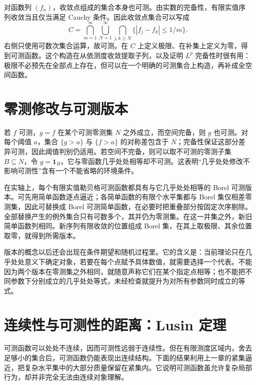 对函数列 $(f_n)$，收敛点组成的集合本身也可测。由实数的完备性，有限实值序列收敛当且仅当满足 Cauchy 条件。因此收敛点集合可以写成
\[
 C=\bigcap_{m=1}^{\infty}\bigcup_{N=1}^{\infty}
 \bigcap_{j,k\geq N}\{|f_j-f_k|\leq1/m\}.
\]
右侧只使用可数次集合运算，故可测。在 $C$ 上定义极限、在补集上定义为零，得到可测函数。这个构造在从依测度收敛提取子列，以及证明 $L^p$ 完备性时很有用：极限不必预先在全部点上存在，但可以在一个明确的可测集合上构造，再补成全空间函数。

\section{零测修改与可测版本}
若 $f$ 可测，$g=f$ 在某个可测零测集 $N$ 之外成立，而空间完备，则 $g$ 也可测。对每个阈值 $a$，集合 $\{g>a\}$ 与 $\{f>a\}$ 的对称差包含于 $N$；完备性保证这部分差异可测，因此阈值判别仍适用。若空间不完备，则可以取不可测的零测子集 $B\subseteq N$，令 $g=\mathbf1_B$，它与零函数几乎处处相等却不可测。这表明“几乎处处修改不影响可测性”含有一个不能省略的环境条件。

在实轴上，每个有限实值勒贝格可测函数都具有与它几乎处处相等的 Borel 可测版本。可先用简单函数逐点逼近；各简单函数的有限个水平集都与 Borel 集仅相差零测集，因此可替换成 Borel 可测简单函数，在必要时把重叠部分按固定次序剔除。全部替换产生的例外集合只有可数多个，其并仍为零测集。在这一并集之外，新旧简单函数列相同。新序列有限收敛的位置组成 Borel 集，在其上取极限、其余位置取零，就得到所需版本。

版本的概念以后还会出现在条件期望和随机过程里。它的含义是：当前理论只在几乎处处意义下确定对象，若要在每个点赋予具体数值，就需要选择一个代表。不能因为两个版本在零测集之外相同，就随意声称它们在某个指定点相等；也不能把不同参数下分别成立的几乎处处等式，未经检查就提升为对所有参数同时成立的等式。

\section{连续性与可测性的距离：Lusin 定理}
\label{sec:mt-lusin}
可测函数可以处处不连续，因而可测性远弱于连续性。但在有限测度区域内，舍去足够小的集合后，可测函数仍能表现出连续结构。下面的结果利用上一章的紧集逼近，把复杂水平集中的大部分质量保留在紧集内。它说明可测函数虽允许复杂局部行为，却并非完全无法由连续对象理解。

